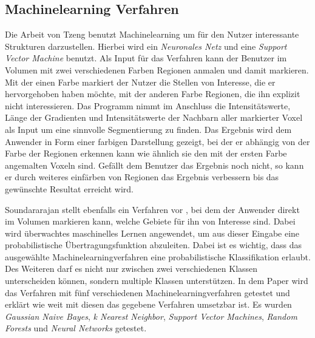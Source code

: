 \subsection{Machinelearning Verfahren}

Die Arbeit von Tzeng \cite{tzeng2005intelligent} benutzt Machinelearning um für den Nutzer interessante Strukturen darzustellen. Hierbei wird ein \textit{Neuronales Netz} und eine \textit{Support Vector Machine} benutzt.
\newline
Als Input für das Verfahren kann der Benutzer im Volumen mit zwei verschiedenen Farben Regionen anmalen und damit markieren. Mit der einen Farbe markiert der Nutzer die Stellen von Interesse, die er hervorgehoben haben möchte, mit der anderen Farbe Regionen, die ihn explizit nicht interessieren.
\newline
Das Programm nimmt im Anschluss die Intensitätswerte, Länge der Gradienten und Intensitätswerte der Nachbarn aller markierter Voxel als Input um eine sinnvolle Segmentierung zu finden.
\newline
Das Ergebnis wird dem Anwender in Form einer farbigen Darstellung gezeigt, bei der er abhängig von der Farbe der Regionen erkennen kann wie ähnlich sie den mit der ersten Farbe angemalten Voxeln sind. Gefällt dem Benutzer das Ergebnis noch nicht, so kann er durch weiteres einfärben von Regionen das Ergebnis verbessern bis das gewünschte Resultat erreicht wird.


Soundararajan stellt ebenfalls ein Verfahren vor \cite{soundararajan2015learning}, bei dem der Anwender direkt im Volumen markieren kann, welche Gebiete für ihn von Interesse sind.
\newline
Dabei wird überwachtes maschinelles Lernen angewendet, um aus dieser Eingabe eine probabilistische Übertragungsfunktion abzuleiten.
\newline
Dabei ist es wichtig, dass das ausgewählte Machinelearningverfahren eine probabilistische Klassifikation erlaubt. Des Weiteren darf es nicht nur zwischen zwei verschiedenen Klassen unterscheiden können, sondern multiple Klassen unterstützen.
\newline
In dem Paper wird das Verfahren mit fünf verschiedenen Machinelearningverfahren getestet und erklärt wie weit mit diesen das gegebene Verfahren umsetzbar ist. Es wurden \textit{Gaussian Naive Bayes}, \textit{k Nearest Neighbor}, \textit{Support Vector Machines}, \textit{Random Forests} und \textit{Neural Networks} getestet.



